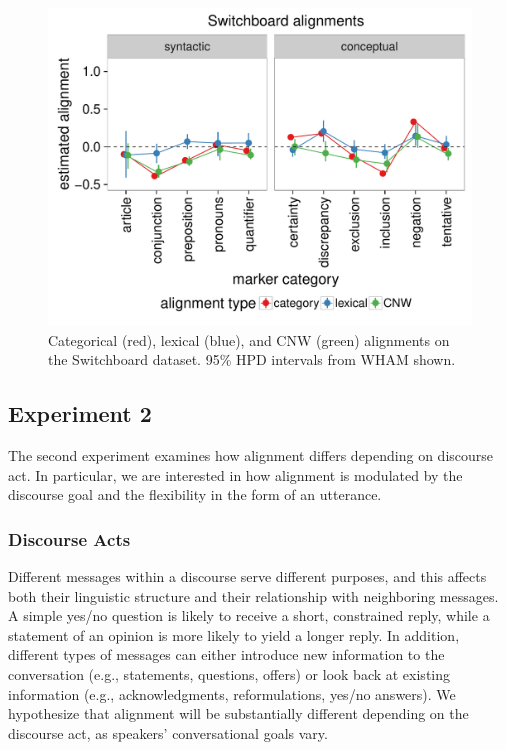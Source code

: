 \documentclass[11pt]{article}
\begin{document}
\begin{figure}[t]
  \begin{center}
    \includegraphics[width=\columnwidth]{results/swbda_line.pdf}
  \end{center}
  \caption{Categorical (red), lexical (blue), and CNW (green) alignments on the Switchboard dataset. 95\% HPD intervals from WHAM shown.}\label{fig:swbda-res}
\end{figure}

\subsection{Experiment 2}

The second experiment examines how alignment differs depending on discourse act. In particular, we are interested in how alignment is modulated by the discourse goal and the flexibility in the form of an utterance.

\subsubsection{Discourse Acts}
Different messages within a discourse serve different purposes, and this affects both their linguistic structure and their relationship with neighboring messages.  A simple yes/no question is likely to receive a short, constrained reply, while a statement of an opinion is more likely to yield a longer reply. In addition, different types of messages can either introduce new information to the conversation (e.g., statements, questions, offers) or look back at existing information (e.g., acknowledgments, reformulations, yes/no answers). We hypothesize that alignment will be substantially different depending on the discourse act, as speakers' conversational goals vary.
\end{document}
